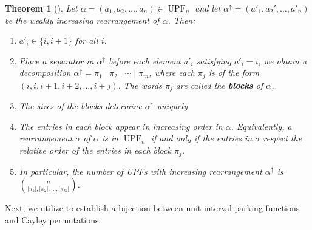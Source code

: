 \documentclass{amsart}
\DeclareMathOperator{\UPF}{UPF} %
\newcommand{\defterm}{\textbf}
\newtheorem{theorem}{Theorem}[section]
\theoremstyle{definition}
\begin{document}
\begin{theorem}[{\cite[Theorem.~2.9]{bradt2024unit}}]
\label{thm:upf_rearrangement}
Let $\alpha = (a_1,a_2, \dots, a_n) \in \UPF_{n}$ and let $\alpha^\uparrow = (a'_1,a_2', \dots, a'_n)$ be the weakly increasing rearrangement of $\alpha$.
Then:
\begin{enumerate}
\item $a'_i\in\{i,i+1\}$ for all $i$.
\item Place a separator in $\alpha^\uparrow$ before each element $a'_i$ satisfying $a'_i=i$, we obtain a decomposition $\alpha^\uparrow=\pi_1\mid\pi_2\mid\cdots\mid\pi_m$, where each $\pi_j$ is of the form $(i,i,i+1,i+2,\dots,i+j)$.  The words $\pi_j$ are called the \defterm{blocks} of $\alpha$.
\item The sizes of the blocks determine $\alpha^\uparrow$ uniquely.
\item The entries in each block appear in increasing order in $\alpha$.  Equivalently, a rearrangement $\sigma$ of $\alpha$ is in $\UPF_{n}$ if and only if the entries in $\sigma$ respect the relative order of the entries in each block $\pi_j$.
\item In particular, the number of UPFs with increasing rearrangement $\alpha^\uparrow$ is $\binom{n}{|\pi_1|,|\pi_2|,\ldots, |\pi_m|}$.
\end{enumerate}
\end{theorem}
Next, we utilize  to establish a bijection between unit interval parking functions and Cayley permutations. 
\end{document}

